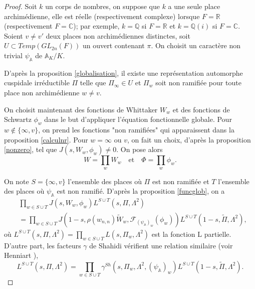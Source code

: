 \documentclass{amsart}
\begin{document}
 \begin{proof}
 Soit $k$ un corps de nombres, on suppose que $k$ a une seule place archimédienne, elle est réelle (respectivement complexe) lorsque $F=\mathbb{R}$ (respectivement $F=\mathbb{C}$); par exemple, $k=\mathbb{Q}$ si $F=\mathbb{R}$ et $k=\mathbb{Q}(i)$ si $F=\mathbb{C}$. Soient $v \neq v'$ deux places non archimédiennes distinctes, soit $U \subset Temp(GL_{2n}(F))$ un ouvert contenant $\pi$. On choisit un caractère non trivial $\psi_\mathbb{A}$ de $\mathbb{A}_K/K$.
 
 D'après la proposition \ref{globalisation}, il existe une représentation automorphe cuspidale irréductible $\Pi$ telle que $\Pi_{\infty} \in U$ et $\Pi_w$ soit non ramifiée pour toute place non archimédienne $w \neq v$.
 
 On choisit maintenant des fonctions de Whittaker $W_w$ et des fonctions de Schwartz $\phi_w$ dans le but d'appliquer l'équation fonctionnelle globale. Pour $w \not\in \{\infty, v\}$, on prend les fonctions "non ramifiées" qui apparaissent dans la proposition \ref{calculnr}. Pour $w = \infty$ ou $v$, on fait un choix, d'après la proposition \ref{nonzero}, tel que $J(s, W_w, \phi_w) \neq 0$. On pose alors
 \begin{equation}
 W = \prod_w W_w \quad \text{et} \quad \Phi  = \prod_w \phi_w.
 \end{equation}
 
 On note $S = \{\infty, v\}$ l'ensemble des places où $\Pi$ est non ramifiée et $T$ l'ensemble des places où $\psi_\mathbb{A}$ est non ramifié. D'après la proposition \ref{funcglob}, on a
 \begin{equation}
 \label{jacquet-shalika}
 \begin{split}
 & \prod_{w \in S \cup T} J(s, W_w, \phi_w) L^{S \cup T}(s, \Pi, \Lambda^2) \\
 &= \prod_{w \in S \cup T} J(1-s, \rho(w_{n,n})\tilde{W}_w, \mathcal{F}_{(\psi_\mathbb{A})_w}(\phi_w)) L^{S \cup T}(1-s, \tilde{\Pi}, \Lambda^2),
 \end{split}
 \end{equation}
 où  $L^{S \cup T}(s, \Pi, \Lambda^2) = \prod_{w \in S \cup T} L(s, \Pi_w, \Lambda^2)$ est la fonction L partielle. D'autre part, les facteurs $\gamma$ de Shahidi vérifient une relation similaire (voir Henniart \cite{henniart}),
 \begin{equation}
 \label{shahidi}
 L^{S \cup T}(s, \Pi, \Lambda^2) = \prod_{w \in S \cup T} \gamma^{Sh}(s, \Pi_w, \Lambda^2, (\psi_\mathbb{A})_w) L^{S \cup T}(1-s, \tilde{\Pi}, \Lambda^2).
 \end{equation}
 

\end{proof}
\end{document}
